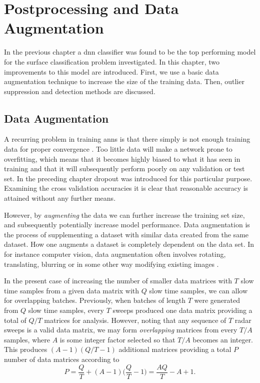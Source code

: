 \chapter{Postprocessing and Data Augmentation}

In the previous chapter a \gls{dnn} classifier was found to be the top performing model for the surface classification problem investigated. In this chapter, two improvements to this model are introduced. First, we use a basic data augmentation technique to increase the size of the training data. Then, outlier suppression and detection methods are discussed.

\section{Data Augmentation}

A recurring problem in training \gls{ann}s is that there simply is not enough training data for proper convergence \citep{lemley_bazrafkan_corcoran_2017}. Too little data will make a network prone to overfitting, which means that it becomes highly biased to what it has seen in training and that it will subsequently perform poorly on any validation or test set. In the preceding chapter dropout was introduced for this particular purpose. Examining the cross validation accuracies it is clear that reasonable accuracy is attained without any further means.

However, by \emph{augmenting} the data we can further increase the training set size, and subsequently potentially increase model performance. Data augmentation is the process of supplementing a dataset with similar data created from the same dataset. How one augments a dataset is completely dependent on the data set. In for instance computer vision, data augmentation often involves rotating, translating, blurring or in some other way modifying existing images \citep{lemley_bazrafkan_corcoran_2017}.

In the present case of increasing the number of smaller data matrices with $T$ slow time samples from a given data matrix with $Q$ slow time samples, we can allow for overlapping batches. Previously, when batches of length $T$ were generated from $Q$ slow time samples, every $T$ sweeps produced one data matrix providing a total of $Q/T$ matrices for analysis. However, noting that any sequence of $T$ radar sweeps is a valid data matrix, we may form \emph{overlapping} matrices from every $T/A$ samples, where $A$ is some integer factor selected so that $T/A$ becomes an integer. This produces $(A-1)(Q/T-1)$ additional matrices providing a total $P$ number of data matrices according to
\begin{equation}
	P = 
	\frac{Q}{T} + (A-1)\Big(\frac{Q}{T} - 1\Big) = 
	\frac{AQ}{T}-A+1.
\end{equation}

